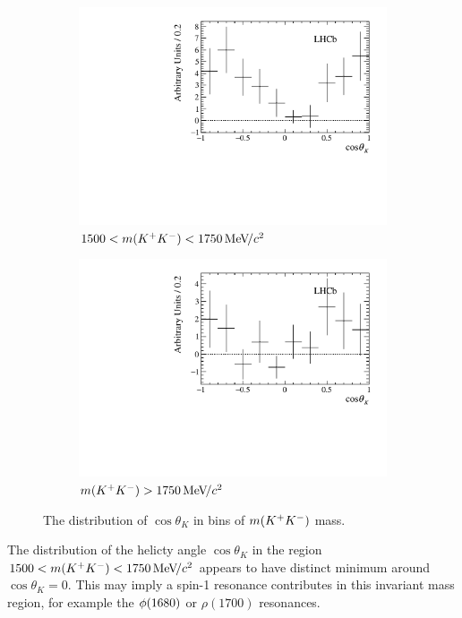 \begin{figure}[!h]
\begin{subfigure}[t]{0.49\textwidth}
        \includegraphics[width=1.0\textwidth]{figs/B2DsKK/helAngle_bin3_sweighted.pdf}
        \caption{$1500<m({{K}^+}{{K}^-})<1750{\mathrm{\,Me\kern -0.1em V\!/}c^2}$}
    \end{subfigure}
    \begin{subfigure}[t]{0.49\textwidth}
        \includegraphics[width=1.0\textwidth]{figs/B2DsKK/helAngle_bin4_sweighted.pdf}
        \caption{$m({{K}^+}{{K}^-})>1750{\mathrm{\,Me\kern -0.1em V\!/}c^2}$}
    \end{subfigure}
    \caption{The distribution of $\cos{\theta_{K}}$ in bins of $m({{K}^+}{{K}^-})$ mass.}
    \label{fig:B2DsKK_helicty_angle_bins}
\end{figure}

The distribution of the helicty angle $\cos{\theta_{K}}$ in the region $1500<m({{K}^+}{{K}^-})<1750{\mathrm{\,Me\kern -0.1em V\!/}c^2}$ appears to have distinct minimum around $\cos{\theta_{K}}=0$. This may imply a spin-1 resonance contributes in this invariant mass region, for example the $\phi(1680)$ or $\rho(1700)$ resonances.


